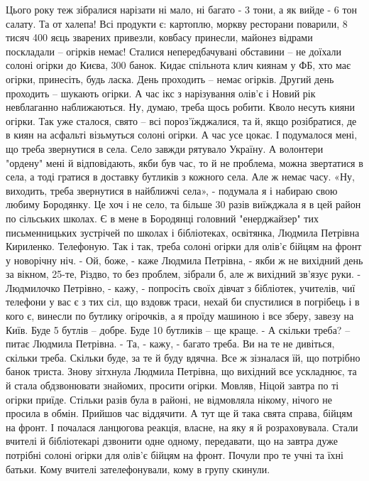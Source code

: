Цього року теж зібралися нарізати ні мало, ні багато - 3 тони, а як вийде - 6 тон салату. Та от халепа! Всі продукти є: картоплю, моркву ресторани поварили, 8 тисяч 400 яєць зварених привезли, ковбасу принесли, майонез відрами поскладали – огірків немає! Сталися непередбачувані обставини – не доїхали солоні огірки до Києва, 300 банок.
Кидає спільнота клич киянам у ФБ, хто має огірки, принесіть, будь ласка.
День проходить – немає огірків. Другий день проходить – шукають огірки. А час ікс з нарізування олів’є і Новий рік невблаганно наближаються. 
Ну, думаю, треба щось робити. Кволо несуть кияни огірки. Так уже сталося, свято – всі пороз’їжджалися, та й, якщо розібратися, де в киян на асфальті візьмуться солоні огірки. А час усе цокає. І подумалося мені, що треба звернутися в села. Село завжди рятувало Україну. А волонтери "ордену" мені й відповідають, якби був час, то й не проблема, можна звертатися в села, а тоді гратися в доставку бутликів з кожного села. Але ж немає часу. 
«Ну, виходить, треба звернутися в найближчі села», - подумала я і набираю свою любиму Бородянку. Це хоч і не село, та більше 30 разів виїжджала я в цей район по сільських школах. Є в мене в Бородянці головний "енерджайзер" тих письменницьких зустрічей по школах і бібліотеках, освітянка, Людмила Петрівна Кириленко. 
Телефоную. Так і так, треба солоні огірки для олів’є бійцям на фронт у новорічну ніч.
- Ой, боже, - каже  Людмила Петрівна, - якби ж не вихідний день за вікном, 25-те, Різдво, то без проблем, зібрали б,  але ж вихідний зв'язує руки.
- Людмилочко Петрівно, - кажу, - попросіть своїх дівчат з бібліотек, учителів, чиї телефони у вас є з тих сіл, що вздовж траси, нехай би спустилися в погрібець і в кого є, винесли по бутлику огірочків, а я проїду машиною і все зберу, завезу на Київ. Буде 5 бутлів – добре. Буде 10 бутликів – ще краще. 
- А скільки треба? – питає Людмила Петрівна. 
- Та, - кажу, - багато треба. Ви на те не дивіться, скільки треба. Скільки буде, за те й буду вдячна.
Все ж зізналася їй, що потрібно банок триста. Знову зітхнула Людмила Петрівна, що вихідний все ускладнює, та й стала обдзвонювати знайомих, просити огірки. Мовляв, Ніцой завтра по ті огірки приїде. Стільки разів була в районі, не відмовляла нікому, нічого не просила в обмін. Прийшов час віддячити. А тут ще й така свята справа, бійцям на фронт. 
І почалася ланцюгова реакція, власне, на яку я й розраховувала. Стали вчителі й бібліотекарі дзвонити одне одному, передавати, що на завтра дуже потрібні солоні огірки для олів’є бійцям на фронт. Почули про те учні та їхні батьки. Кому вчителі зателефонували, кому в групу скинули. 
